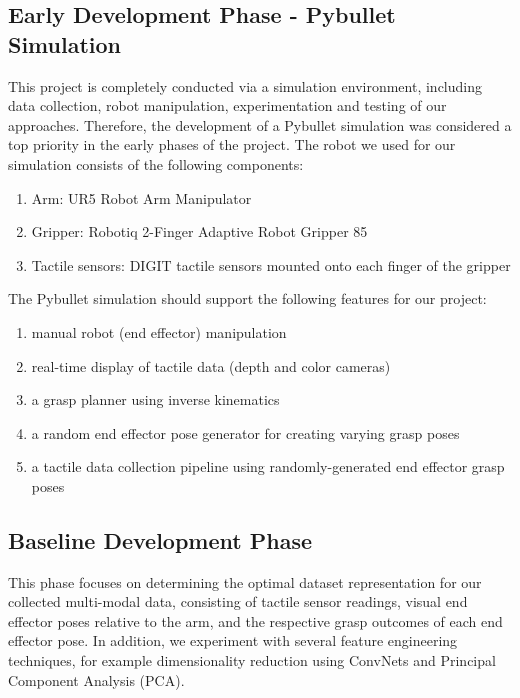 \documentclass[11pt, a4paper]{report}
\theoremstyle{definition}
\begin{document}
\subsection{Early Development Phase - Pybullet Simulation}
\label{sec:1.4.2}
This project is completely conducted via a simulation environment, including data collection, robot manipulation, experimentation and testing of our approaches. Therefore, the development of a Pybullet simulation was considered a top priority in the early phases of the project. The robot we used for our simulation consists of the following components:
\begin{enumerate}
    \item Arm: UR5 Robot Arm Manipulator
    \item Gripper: Robotiq 2-Finger Adaptive Robot Gripper 85
    \item Tactile sensors: DIGIT tactile sensors \cite{Lambeta2020DIGIT} mounted onto each finger of the gripper
\end{enumerate}
The Pybullet simulation should support the following features for our project:
\begin{enumerate}
    \item manual robot (end effector) manipulation
    \item real-time display of tactile data (depth and color cameras)
    \item a grasp planner using inverse kinematics
    \item a random end effector pose generator for creating varying grasp poses
    \item a tactile data collection pipeline using randomly-generated end effector grasp poses
\end{enumerate}


\subsection{Baseline Development Phase}
\label{sec:1.4.3}
This phase focuses on determining the optimal dataset representation for our collected multi-modal data, consisting of tactile sensor readings, visual end effector poses relative to the arm, and the respective grasp outcomes of each end effector pose. In addition, we experiment with several feature engineering techniques, for example dimensionality reduction using ConvNets and Principal Component Analysis (PCA).
\end{document}
